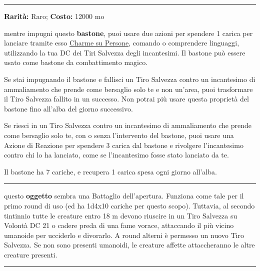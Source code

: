 \begin{multicols}{2}
\smallskip\noindent\rule{\linewidth}{2pt}  \hypertarget{BastonedelloCharme}{}\medskip{}\noindent\label{BastonedelloCharme}

\textbf{Rarità:} Raro; \textbf{Costo:} 12000 mo

mentre impugni questo \textbf{bastone}, puoi usare due azioni per spendere 1 carica per lanciare tramite esso \hyperlink{Charme su Persone}{Charme su Persone}, comando o comprendere linguaggi, utilizzando la tua DC dei Tiri Salvezza degli incantesimi. Il bastone può essere usato come bastone da combattimento magico.

Se stai impugnando il bastone e fallisci un Tiro Salvezza contro un incantesimo di ammaliamento che prende come bersaglio solo te e non un'area, puoi trasformare il Tiro Salvezza fallito in un successo. Non potrai più usare questa proprietà del bastone fino all'alba del giorno successivo.

Se riesci in un Tiro Salvezza contro un incantesimo di ammaliamento che prende come bersaglio solo te, con o senza l'intervento del bastone, puoi usare una Azione di Reazione per spendere 3 carica dal bastone e rivolgere l'incantesimo contro chi lo ha lanciato, come se l'incantesimo fosse stato lanciato da te.

Il bastone ha 7 cariche, e recupera 1 carica spesa ogni giorno all'alba.

\smallskip\noindent\rule{\linewidth}{2pt}  \hypertarget{BattagliodelCannibalismo}{}\medskip{}\noindent\label{BattagliodelCannibalismo}

questo \textbf{oggetto} sembra una Battaglio dell'apertura. Funziona come tale per il primo round di uso (ed ha 1d4x10 cariche per questo scopo). Tuttavia, al secondo tintinnio tutte le creature entro 18 m devono riuscire in un Tiro Salvezza su Volontà DC 21 o cadere preda di una fame vorace, attaccando il più vicino umanoide per ucciderlo e divorarlo. A round alterni è permesso un nuovo Tiro Salvezza. Se non sono presenti umanoidi, le creature affette attaccheranno le altre creature presenti.

\smallskip\noindent\rule{\linewidth}{2pt}  \hypertarget{Battagliodell'Apertura}{}\medskip{}\noindent\label{Battagliodell'Apertura}


\end{multicols}
